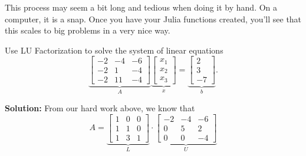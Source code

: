\vspace*{.2cm}

\begin{tcolorbox}[sharp corners, colback=green!30, colframe=green!80!blue, title=\textbf{\large Major Important Fact}]  This process may seem a bit long and tedious when doing it by hand. On a computer, it is a snap. Once you have your Julia functions created, you'll see that this scales to big problems in a very nice way.
\end{tcolorbox}
\vspace*{1cm}

\begin{example}
\label{ex:SolveUsingLu01} 
Use LU Factorization to solve the system of linear equations
\begin{equation}
    \label{eq:Chap5pt4A}
\underbrace{\left[\begin{array}{rrr} -2 & -4 & -6\\
-2 & 1 & -4 \\ -2 & 11 & -4 \end{array}\right]}_{A}  \underbrace{\left[\begin{array}{r} x_1\\
x_2 \\ x_3\end{array}\right]}_{x} 
= \underbrace{\left[\begin{array}{r} 2\\
3 \\ -7 \end{array}\right]}_{b}. 
\end{equation}
\end{example}

\textbf{Solution:} From our hard work above, we know that 
\begin{equation}
    \label{eq:Chap5pt4LU}
    A= \underbrace{\left[\begin{array}{rrr} 1 & 0 & 0\\ 1 & 1 & 0\\ 1 & 3 & 1\end{array} \right]}_{L} \cdot  \underbrace{\left[\begin{array}{rrr} -2 & -4 & -6 \\ 0 & 5 &  2 \\ 0 &  0 & -4\end{array} \right]}_{U} 
    \end{equation}

